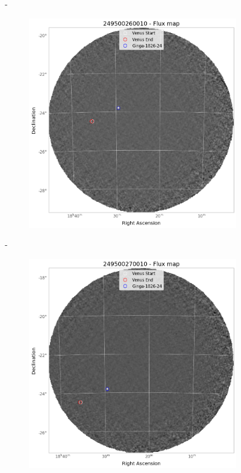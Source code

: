 \begin{figure}[H]
\begin{subfigure}{.45\textwidth}
        \end{subfigure}
        \hspace{1em}-
        \begin{subfigure}{.45\textwidth}
            \centering
            \includegraphics[width=\textwidth]{report/Figures/methods/2404/26_map.png}
        \end{subfigure}
        \hspace{1em}-
        \begin{subfigure}{.45\textwidth}
            \centering
            \includegraphics[width=\textwidth]{report/Figures/methods/2404/27_map.png}
        \end{subfigure}
        \caption{}
        \label{24_map}
    \end{figure}

